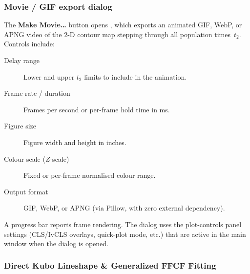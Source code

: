 \subsubsection{Movie / GIF export dialog}

The \textbf{Make Movie\ldots} button opens , which
exports an animated GIF, WebP, or APNG video of the 2-D contour map stepping
through all population times~$t_2$. Controls include:

\begin{description}
  \item[Delay range] Lower and upper $t_2$ limits to include in the animation.
  \item[Frame rate / duration] Frames per second or per-frame hold time in ms.
  \item[Figure size] Figure width and height in inches.
  \item[Colour scale ($Z$-scale)] Fixed or per-frame normalised colour range.
  \item[Output format] GIF, WebP, or APNG (via Pillow, with zero external  dependency).
\end{description}

A progress bar reports frame rendering. The dialog uses the plot-controls
panel settings (CLS/IvCLS overlays, quick-plot mode, etc.) that are active
in the main window when the dialog is opened.

\subsubsection{Direct Kubo Lineshape \& Generalized FFCF Fitting}\label{sec:twoD:kubo}

